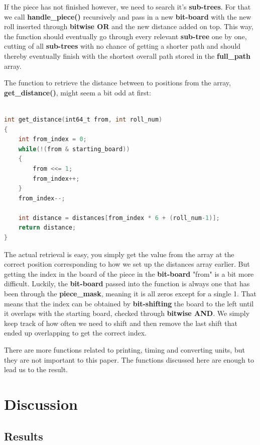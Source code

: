 \documentclass[12pt]{article}
\begin{document}
If the piece has not finished however, we need to search it's \textbf{sub-trees}. For that we call \textbf{handle\_piece()} recursively and pass in a new \textbf{bit-board} with the new roll inserted through \textbf{bitwise OR} and the new distance added on top.
This way, the function should eventually go through every relevant \textbf{sub-tree} one by one, cutting of all \textbf{sub-trees} with no chance of getting a shorter path and should thereby eventually finish with the shortest overall path stored in the \textbf{full\_path} array.


The function to retrieve the distance between to positions from the array, \textbf{get\_distance()}, might seem a bit odd at first:

\begin{lstlisting}[language=C, caption={Get distance}, label={lst:get-distance}]

int get_distance(int64_t from, int roll_num)
{
    int from_index = 0;
    while(!(from & starting_board))
    {
        from <<= 1;
        from_index++;
    }
    from_index--;

    int distance = distances[from_index * 6 + (roll_num-1)];
    return distance;
}
\end{lstlisting}

The actual retrieval is easy, you simply get the value from the array at the correct position corresponding to how we set up the distances array earlier. But getting the index in the board of the piece in the \textbf{bit-board} "from" is a bit more difficult. Luckily, the \textbf{bit-board} passed into the function is always one that has been through the \textbf{piece\_mask}, meaning it is all zeros except for a single 1. That means that the index can be obtained by \textbf{bit-shifting} the board to the left until it overlaps with the starting board, checked through \textbf{bitwise AND}. We simply keep track of how often we need to shift and then remove the last shift that ended up overlapping to get the correct index.

There are more functions related to printing, timing and converting units, but they are not important to this paper. The functions discussed here are enough to lead us to the result.

\section{Discussion}

\subsection{Results}
\end{document}

